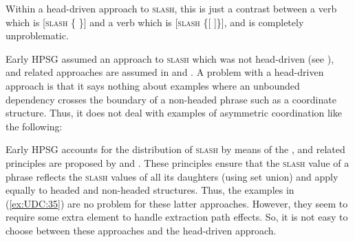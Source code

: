 \documentclass[output=paper
,notxmath 
 	        ,biblatex
                ,babelshorthands
                ,newtxmath
                ,draftmode
                ,colorlinks, citecolor=brown
]{langscibook}
\begin{document}
\eal
\label{ex:UDC:34}

\zl

\noindent
Within a head-driven approach to \textsc{slash}, this is just a contrast between a
verb which is [\textsc{slash} \{ \}] and a verb which is [\textsc{slash}
\{[ ]\}], and is completely unproblematic.

Early HPSG assumed an approach to \textsc{slash} which was not
head-driven (see \citealt[Chapter~4]{Pollard:Sag:94}), and related
approaches are assumed in \citet{Levine:Hukari:06} and \citet[497]{Chaves:12}.  A problem
with a head-driven approach is that it says nothing about examples
where an unbounded dependency crosses the boundary of a non-headed
phrase such as a coordinate structure. Thus, it does not deal with
examples of asymmetric coordination like the following:

\begin{exe} \ex \begin{xlist} \label{ex:UDC:35}
\ex[]{ How much can you [drink \trace{}] and [still stay sober]]?}

\end{xlist}
\end{exe}


\noindent
Early HPSG \citep[Chapter~4]{Pollard:Sag:94} accounts for the distribution of
\textsc{slash} by means of the , and related
principles are proposed by \citet[354]{Levine:Hukari:06} and
\citet[497]{Chaves:12}. These principles ensure that the \textsc{slash}
value of a phrase reflects the \textsc{slash} values of all its
daughters (using set union) and apply equally to headed and non-headed
structures. Thus, the examples in (\ref{ex:UDC:35}) are no problem for
these latter approaches. However, they seem to require some extra element to
handle extraction path effects. So, it is not easy to choose between
these approaches and the head-driven approach.\label{page-end-extraction-path-effects}
\end{document}
